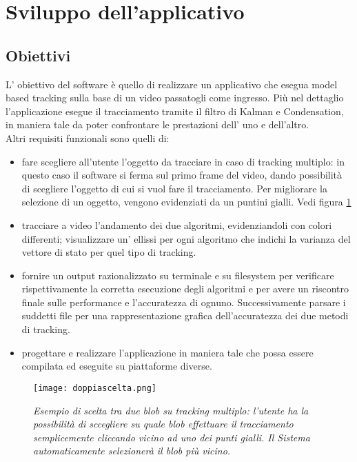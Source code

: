 
\section{Sviluppo dell'applicativo}

\subsection{Obiettivi}
L' obiettivo del software è quello di realizzare un applicativo che esegua model based tracking sulla base di un video passatogli come ingresso. Più nel dettaglio l'applicazione esegue il tracciamento tramite il filtro di Kalman e Condensation, in maniera tale da poter confrontare le prestazioni dell' uno e dell'altro.\\
Altri requisiti funzionali sono quelli di:

\begin{itemize}
 \item  fare scegliere all'utente l'oggetto da tracciare in caso di tracking multiplo: in questo caso il software si ferma sul primo frame del video, dando possibilità di scegliere l'oggetto di cui si vuol fare il tracciamento. Per migliorare la selezione di un oggetto, vengono evidenziati da un puntini gialli. Vedi figura \ref{fig:scelta2blob}

\item tracciare a video l'andamento dei due algoritmi, evidenziandoli con colori differenti; visualizzare un' ellissi per ogni algoritmo che indichi la varianza del vettore di stato per quel tipo di tracking.

\item fornire un output razionalizzato su terminale e su filesystem per verificare rispettivamente la corretta esecuzione degli algoritmi e per avere un riscontro finale sulle performance e l'accuratezza di ognuno. Successivamente parsare i suddetti file per una rappresentazione grafica dell'accuratezza dei due metodi di tracking.

\item progettare e realizzare l'applicazione in maniera tale che possa essere compilata ed eseguite su piattaforme diverse.


\end{itemize}

\begin{figure}[hb]
\centering
	\texttt{[image: doppiascelta.png]}
\caption[Esempio di scelta tra due blob]{\textit{Esempio di scelta tra due blob su tracking multiplo: l'utente ha la possibilità di sccegliere su quale blob effettuare il tracciamento semplicemente cliccando vicino ad uno dei punti gialli. Il Sistema automaticamente selezionerà il blob più vicino.}\label{fig:scelta2blob}}
\end{figure}



